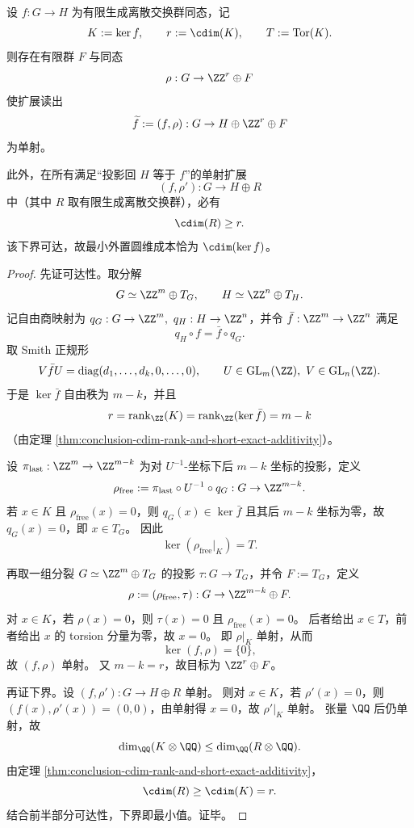 \begin{theorem}[读出单射化的最小外置圆维成本]\label{thm:conclusion-minimal-external-cdim-equals-kernel-cdim}
设 \(f:G\to H\) 为有限生成离散交换群同态，记
\[
K:=\ker f,\qquad r:=\cdim(K),\qquad T:=\operatorname{Tor}(K).
\]
则存在有限群 \(F\) 与同态
\[
\rho:G\to \ZZ^r\oplus F
\]
使扩展读出
\[
\widetilde f:=(f,\rho):G\to H\oplus\ZZ^r\oplus F
\]
为单射。

此外，在所有满足“投影回 \(H\) 等于 \(f\)”的单射扩展
\[
(f,\rho'):G\to H\oplus R
\]
中（其中 \(R\) 取有限生成离散交换群），必有
\[
\cdim(R)\ge r.
\]
该下界可达，故最小外置圆维成本恰为 \(\cdim(\ker f)\)。
\end{theorem}
\begin{proof}
先证可达性。取分解
\[
G\simeq \ZZ^m\oplus T_G,\qquad H\simeq \ZZ^n\oplus T_H.
\]
记自由商映射为 \(q_G:G\to \ZZ^m,\ q_H:H\to \ZZ^n\)，并令 \(\bar f:\ZZ^m\to\ZZ^n\) 满足
\[
q_H\circ f=\bar f\circ q_G.
\]
取 Smith 正规形
\[
V\bar f U=\operatorname{diag}(d_1,\dots,d_k,0,\dots,0),\qquad U\in\mathrm{GL}_m(\ZZ),\ V\in\mathrm{GL}_n(\ZZ).
\]
于是 \(\ker\bar f\) 自由秩为 \(m-k\)，并且
\[
r=\operatorname{rank}_{\ZZ}(K)=\operatorname{rank}_{\ZZ}(\ker\bar f)=m-k
\]
（由定理 \ref{thm:conclusion-cdim-rank-and-short-exact-additivity}）。

设 \(\pi_{\mathrm{last}}:\ZZ^m\to\ZZ^{m-k}\) 为对 \(U^{-1}\)-坐标下后 \(m-k\) 坐标的投影，定义
\[
\rho_{\mathrm{free}}:=\pi_{\mathrm{last}}\circ U^{-1}\circ q_G:G\to \ZZ^{m-k}.
\]
若 \(x\in K\) 且 \(\rho_{\mathrm{free}}(x)=0\)，则 \(q_G(x)\in\ker\bar f\) 且其后 \(m-k\) 坐标为零，故 \(q_G(x)=0\)，即 \(x\in T_G\)。
因此
\[
\ker(\rho_{\mathrm{free}}|_K)=T.
\]

再取一组分裂 \(G\simeq \ZZ^m\oplus T_G\) 的投影 \(\tau:G\to T_G\)，并令 \(F:=T_G\)，定义
\[
\rho:=(\rho_{\mathrm{free}},\tau):G\to \ZZ^{m-k}\oplus F.
\]
对 \(x\in K\)，若 \(\rho(x)=0\)，则 \(\tau(x)=0\) 且 \(\rho_{\mathrm{free}}(x)=0\)。
后者给出 \(x\in T\)，前者给出 \(x\) 的 torsion 分量为零，故 \(x=0\)。
即 \(\rho|_K\) 单射，从而
\[
\ker(f,\rho)=\{0\},
\]
故 \((f,\rho)\) 单射。
又 \(m-k=r\)，故目标为 \(\ZZ^r\oplus F\)。

再证下界。设 \((f,\rho'):G\to H\oplus R\) 单射。
则对 \(x\in K\)，若 \(\rho'(x)=0\)，则 \((f(x),\rho'(x))=(0,0)\)，由单射得 \(x=0\)，故 \(\rho'|_K\) 单射。
张量 \(\QQ\) 后仍单射，故
\[
\dim_{\QQ}(K\otimes\QQ)\le \dim_{\QQ}(R\otimes\QQ).
\]
由定理 \ref{thm:conclusion-cdim-rank-and-short-exact-additivity}，
\[
\cdim(R)\ge \cdim(K)=r.
\]
结合前半部分可达性，下界即最小值。证毕。
\end{proof}


